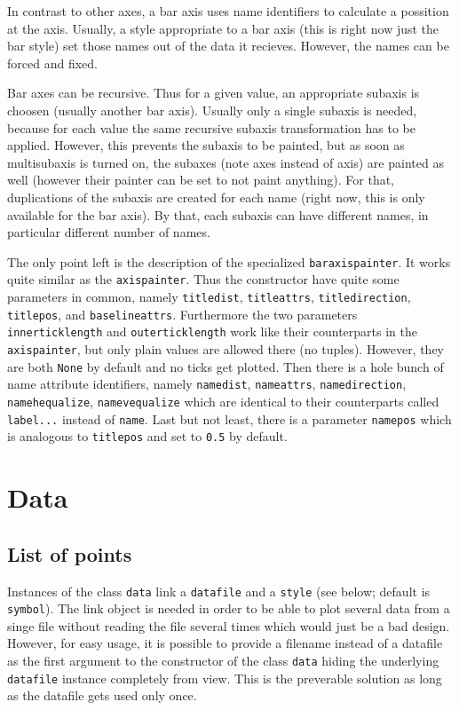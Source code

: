 In contrast to other axes, a bar axis uses name identifiers to
calculate a possition at the axis. Usually, a style appropriate to a
bar axis (this is right now just the bar style) set those names out of
the data it recieves. However, the names can be forced and fixed.

Bar axes can be recursive. Thus for a given value, an appropriate
subaxis is choosen (usually another bar axis). Usually only a single
subaxis is needed, because for each value the same recursive subaxis
transformation has to be applied. However, this prevents the subaxis
to be painted, but as soon as multisubaxis is turned on, the subaxes
(note axes instead of axis) are painted as well (however their painter
can be set to not paint anything). For that, duplications of the
subaxis are created for each name (right now, this is only available
for the bar axis). By that, each subaxis can have different names, in
particular different number of names.

The only point left is the description of the specialized
\verb|baraxispainter|. It works quite similar as the
\verb|axispainter|. Thus the constructor have quite some parameters in
common, namely \verb|titledist|, \verb|titleattrs|,
\verb|titledirection|, \verb|titlepos|, and \verb|baselineattrs|.
Furthermore the two parameters \verb|innerticklength| and
\verb|outerticklength| work like their counterparts in the
\verb|axispainter|, but only plain values are allowed there (no
tuples). However, they are both \verb|None| by default and no ticks
get plotted. Then there is a hole bunch of name
attribute identifiers, namely \verb|namedist|, \verb|nameattrs|,
\verb|namedirection|, \verb|namehequalize|, \verb|namevequalize| which
are identical to their counterparts called \verb|label...| instead of
\verb|name|. Last but not least, there is a parameter \verb|namepos|
which is analogous to \verb|titlepos| and set to \verb|0.5| by
default.

\section{Data}
\label{graph:data}

\subsection{List of points}

Instances of the class \verb|data| link a \verb|datafile| and a
\verb|style| (see below; default is \verb|symbol|). The link object is
needed in order to be able to plot several data from a singe file
without reading the file several times which would just be a bad
design. However, for easy usage, it is possible to provide a filename
instead of a datafile as the first argument to the constructor of the
class \verb|data| hiding the underlying \verb|datafile| instance
completely from view. This is the preverable solution as long as the
datafile gets used only once.

